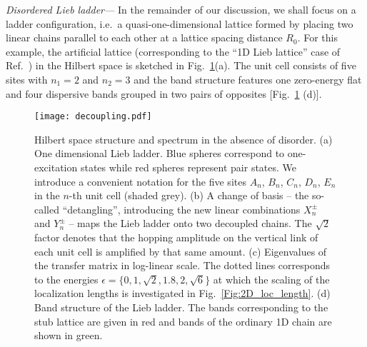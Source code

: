 \documentclass[prl,aps,twocolumn,showpacs,superscriptaddress,longbibliography]{revtex4-1}
\begin{document}
\emph{Disordered Lieb ladder---} In the remainder of our discussion, we shall focus on a ladder configuration, i.e.~a quasi-one-dimensional lattice formed by placing two linear chains parallel to each other at a lattice spacing distance $R_0$. For this example, the artificial lattice (corresponding to the ``1D Lieb lattice'' case of Ref.~\cite{Leykam2017}) in the Hilbert space is sketched in Fig.~\ref{Fig:decoupling}(a). The unit cell consists of five sites with $n_1 = 2$ and $n_2 = 3$ and the band structure features one zero-energy flat and four dispersive bands grouped in two pairs of opposites [Fig.~\ref{Fig:decoupling} (d)].

\begin{figure}
\texttt{[image: decoupling.pdf]}
\caption{Hilbert space structure and spectrum in the absence of disorder. (a) One dimensional Lieb ladder. Blue spheres correspond to one-excitation states while red spheres represent pair states. We introduce a convenient notation for the five sites $A_n$, $B_n$, $C_n$, $D_n$, $E_n$ in the $n$-th unit cell (shaded grey). (b) A change of basis -- the so-called ``detangling'', introducing the new linear combinations $X_n^\pm$ and $Y_n^\pm$ \cite{a_Flach_EPL_14,Leykam2017} -- maps the Lieb ladder onto two decoupled chains. The $\sqrt{2}$ factor denotes that the hopping amplitude on the vertical link of each unit cell is amplified by that same amount. (c) Eigenvalues of the transfer matrix in log-linear scale. The dotted lines corresponds to the energies $\epsilon = \{0,1, \sqrt 2, 1.8, 2, \sqrt 6\}$ at which the scaling of the localization lengths is investigated in Fig.~\ref{Fig:2D_loc_length}. (d) Band structure of the Lieb ladder. The bands corresponding to the stub lattice are given in red and bands of the ordinary 1D chain are shown in green.}
\label{Fig:decoupling}
\end{figure}
\end{document}
